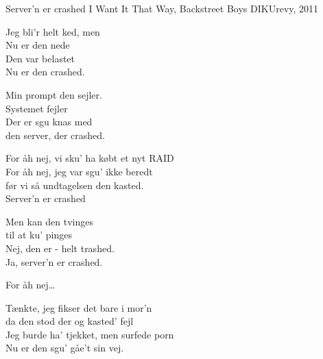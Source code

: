 \begin{song}{Server'n er crashed}
  {} %
  {I Want It That Way, Backstreet Boys} %
  {} %
  {DIKUrevy, 2011} %
  {\NotCCLIed} %

  \begin{SBVerse}
    Jeg bli'r helt ked, men\\
    Nu er den nede\\
    Den var belastet\\
    Nu er den crashed.
  \end{SBVerse}

  \begin{SBVerse}
    Min prompt den sejler.\\
    Systemet fejler\\
    Der er sgu knas med\\
    den server, der crashed.
  \end{SBVerse}

  \begin{SBChorus}
    For åh nej, vi sku' ha købt et nyt RAID\\
    For åh nej, jeg var sgu' ikke beredt\\
    før vi så undtagelsen den kasted.\\
    Server'n er crashed
  \end{SBChorus}

  \begin{SBVerse}
    Men kan den tvinges\\
    til at ku' pinges\\
    Nej, den er - helt trashed.\\
    Ja, server'n er crashed.
  \end{SBVerse}

  \begin{SBChorus}
    For åh nej\ldots
  \end{SBChorus}

  \begin{SBSection*}
    Tænkte, jeg fikser det bare i mor'n\\
    da den stod der og kasted' fejl\\
    Jeg burde ha' tjekket, men surfede porn\\
    Nu er den sgu' gåe't sin vej.
  \end{SBSection*}


\end{song}
